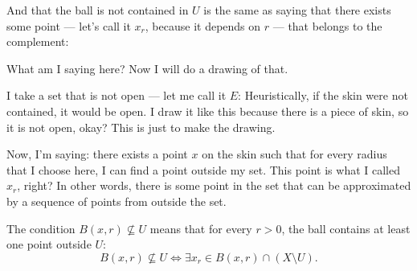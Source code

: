 \begin{proofWrapper}
\begin{speech}[00:48:45 - 00:50:46]
And that the ball is not contained in $U$ is the same as saying that there exists some point --- let's call it $x_r$, because it depends on $r$ --- that belongs to the complement: 

What am I saying here? Now I will do a drawing of that.

I take a set that is not open --- let me call it $E$:  Heuristically, if the skin were not contained, it would be open. I draw it like this because there is a piece of skin, so it is not open, okay? This is just to make the drawing.

Now, I'm saying: there exists a point $x$ on the skin  such that for every radius that I choose here, I can find a point outside my set. This point is what I called $x_r$, right?  In other words, there is some point in the set that can be approximated by a sequence of points from outside the set.
\end{speech}

\begin{content}
The condition $B(x, r) \not\subseteq U$ means that for every $r > 0$, the ball contains at least one point outside $U$:
\begin{equation}\label{eq:point-outside-U}
B(x, r) \not\subseteq U \iff \exists x_r \in B(x, r) \cap (X \setminus U).
\end{equation}

\begin{center}
\end{center}
\end{content}
\end{proofWrapper}
